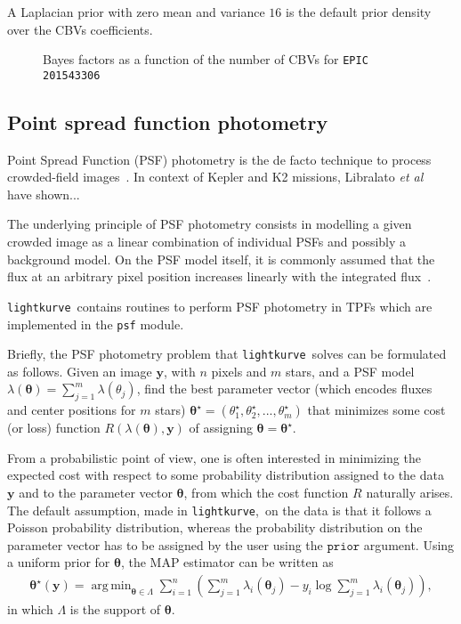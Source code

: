 \documentclass[twocolumn]{aastex62}
\newcommand{\lightkurve}{\texttt{lightkurve}}
\DeclareMathOperator*{\argmin}{arg\,min}
\begin{document}
A Laplacian prior with zero mean and variance $16$ is the default prior
density over the CBVs coefficients.

\begin{figure}[!htb]
    \centering
    \caption{Bayes factors as a function of the number of CBVs for \texttt{EPIC 201543306}}
    \label{fig:cbv-grid-search}
\end{figure}


\subsection{Point spread function photometry}

Point Spread Function (PSF) photometry is the de facto technique to
process crowded-field images~\cite{stetson1987, heasley1999}. In context of Kepler
and K2 missions, Libralato \textit{et al}~\cite{libralato2016} have shown...

The underlying principle of PSF photometry consists in modelling a given crowded
image as a linear combination of individual PSFs and possibly a background model.
On the PSF model itself, it is commonly assumed that the flux
at an arbitrary pixel position increases linearly with the integrated
flux~\cite{stetson1987, heasley1999}.

\lightkurve ~contains routines to perform PSF photometry in TPFs
which are implemented in the \texttt{psf} module.

Briefly, the PSF photometry problem that \lightkurve~solves can be formulated as
follows. Given an image $\bm{y}$, with $n$ pixels and $m$ stars, and a PSF model
$\lambda(\bm{\theta}) = \sum_{j=1}^{m} \lambda({\theta}_j)$,
find the best parameter vector (which encodes fluxes and center positions for $m$
stars) $\bm{\theta}^{\star} = (\theta_1^{\star}, \theta_2^{\star}, ..., \theta_m^{\star})$
that minimizes some cost (or loss) function $R(\lambda(\bm{\theta}), \bm{y})$
of assigning $\bm{\theta} = \bm{\theta}^{\star}$.

From a probabilistic point of view, one is often interested in minimizing the
expected cost with respect to some probability distribution assigned to the data
$\bm{y}$ and to the parameter vector $\bm{\theta}$, from which the cost function
$R$ naturally arises. The default assumption, made in \lightkurve,~on the data is
that it follows a Poisson probability distribution, whereas the probability
distribution on the parameter vector has to be assigned by the user using the $\texttt{prior}$
argument. Using a uniform prior for $\bm{\theta}$, the MAP estimator can be written
as
\begin{align}
    \bm{\theta}^{\star}(\bm{y}) = \argmin_{\bm{\theta} \in \Lambda} \sum_{i=1}^{n}
    \left(\sum_{j=1}^{m}\lambda_i(\bm{\theta}_j) - y_i\log\sum_{j=1}^{m}\lambda_i(\bm{\theta}_j)\right),
\end{align}
in which $\Lambda$ is the support of $\bm{\theta}$.
\end{document}
